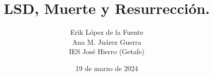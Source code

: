 \documentclass[a4paper, titlepage]{article}
\title{LSD, Muerte y Resurrección.}
\author{Erik López de la Fuente \\ Ana M. Juárez Guerra \\ IES José Hierro (Getafe)}
\date{19 de marzo de 2024}
\begin{document}
\maketitle

\begin{abstract}
\end{abstract}

\tableofcontents
\end{document}
